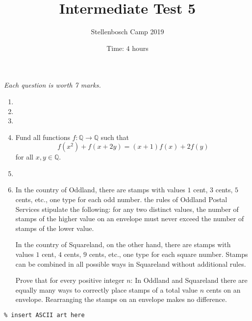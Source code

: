 \documentclass{article}
\title{Intermediate Test 5}
\author{Stellenbosch Camp 2019}
\date{Time: $4$ hours}
\begin{document}
\maketitle
\thispagestyle{empty}

\hfill\textit{Each question is worth 7 marks.}

\vfill
\vfill


\begin{enumerate}[1.]

\item %


\vfill

\item %


\vfill

\item %


\vfill

\item %
\newcommand{\QQ}{\mathbb{Q}}
Fund all functions $f : \QQ \to \QQ$ such that
\[ f(x^2) +f(x+2y) = (x+1)f(x) +2f(y) \]
for all $x, y \in \QQ$.


\vfill

\item %


\vfill

\item %
In the country of Oddland, there are stamps with values $1$ cent, $3$ cents, $5$ cents, etc., one type for each odd number.
the rules of Oddland Postal Services stipulate the following: for any two distinct values, the number of stamps of the higher value on an envelope must never exceed the number of stamps of the lower value.

In the country of Squareland, on the other hand, there are stamps with values $1$ cent, $4$ cents, $9$ cents, etc., one type for each square number.
Stamps can be combined in all possible ways in Squareland without additional rules.

Prove that for every positive integer $n$:
In Oddland and Squareland there are equally many ways to correctly place stamps of a total value $n$ cents on an envelope.
Rearranging the stamps on an envelope makes no difference.


\end{enumerate}


\vfill
\vfill

\begin{center}
\begin{BVerbatim}
\end{BVerbatim}
\end{center}
\end{document}
